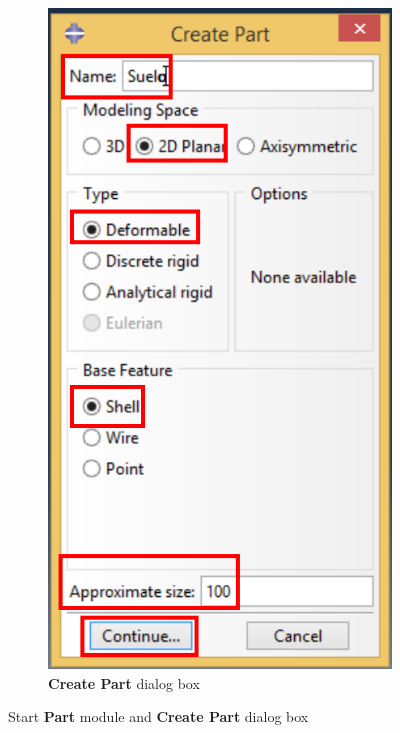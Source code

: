 \begin{figure}[!h]
\begin{subfigure}[!h]{0.39\textwidth}
    \includegraphics[width=\textwidth]{./body/images/part02.pdf}
    \caption{\textbf{Create Part} dialog box}
    \label{part02}
  \end{subfigure}%
  \caption{Start \textbf{Part} module and \textbf{Create Part} dialog
    box}
\end{figure}

